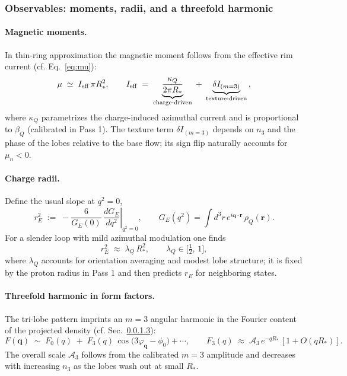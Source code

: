 \subsubsection{Observables: moments, radii, and a threefold harmonic}
\label{sec:baryons-phenomenology:observables}

\paragraph{Magnetic moments.}
In thin-ring approximation the magnetic moment follows from the effective rim current (cf. Eq.~\eqref{eq:mu}):
\begin{equation}
\mu \;\simeq\; I_{\rm eff}\,\pi R_\ast^2,
\qquad
I_{\rm eff}\;=\; \underbrace{\frac{\kappa_Q}{2\pi R_\ast}}_{\text{charge-driven}} \;+\; \underbrace{\delta I_{(m=3)}}_{\text{texture-driven}}\,,
\label{eq:mu-predict}
\end{equation}
where $\kappa_Q$ parametrizes the charge-induced azimuthal current and is proportional to $\beta_Q$ (calibrated in Pass 1). The texture term $\delta I_{(m=3)}$ depends on $n_3$ and the phase of the lobes relative to the base flow; its sign flip naturally accounts for $\mu_n<0$.

\paragraph{Charge radii.}
Define the usual slope at $q^2\!=\!0$,
\begin{equation}
r_E^2 \;:=\; -\frac{6}{G_E(0)}\,\left.\frac{dG_E}{dq^2}\right|_{q^2=0},\qquad
G_E(q^2)=\int d^3r\,e^{i\mathbf q\cdot\mathbf r}\,\rho_Q(\mathbf r).
\label{eq:rE-def}
\end{equation}
For a slender loop with mild azimuthal modulation one finds
\begin{equation}
r_E^2 \;\approx\; \lambda_Q\,R_\ast^2,\qquad \lambda_Q\in\Big[\tfrac{1}{2},\,1\Big],
\label{eq:rE-approx}
\end{equation}
where $\lambda_Q$ accounts for orientation averaging and modest lobe structure; it is fixed by the proton radius in Pass 1 and then predicts $r_E$ for neighboring states.

\paragraph{Threefold harmonic in form factors.}
\label{sec:baryons:ff}
The tri-lobe pattern imprints an $m{=}3$ angular harmonic in the Fourier content of the projected density (cf. Sec.~\ref{sec:baryons:ff}):
\begin{equation}
F(\mathbf q)\;\sim\;F_0(q)\;+\;F_3(q)\,\cos\!\big(3\varphi_{\mathbf q}-\phi_0\big)+\cdots,
\qquad
F_3(q)\;\approx\;\mathcal A_3\,e^{-qR_\ast}\,[1+O(qR_\ast)].
\label{eq:F3}
\end{equation}
The overall scale $\mathcal A_3$ follows from the calibrated $m{=}3$ amplitude and decreases with increasing $n_3$ as the lobes wash out at small $R_\ast$.

